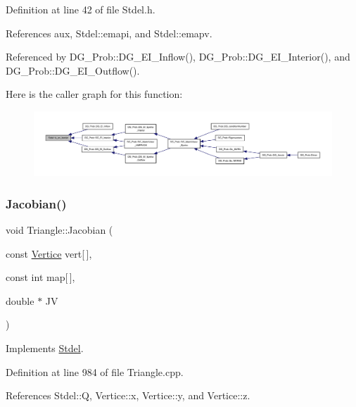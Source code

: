 Definition at line 42 of file Stdel.\+h.



References aux, Stdel\+::emapi, and Stdel\+::emapv.



Referenced by D\+G\+\_\+\+Prob\+::\+D\+G\+\_\+\+E\+I\+\_\+\+Inflow(), D\+G\+\_\+\+Prob\+::\+D\+G\+\_\+\+E\+I\+\_\+\+Interior(), and D\+G\+\_\+\+Prob\+::\+D\+G\+\_\+\+E\+I\+\_\+\+Outflow().

Here is the caller graph for this function\+:
\nopagebreak
\begin{figure}[H]
\begin{center}
\leavevmode
\includegraphics[width=350pt]{classStdel_abb022f0ad81707e11e3a3091d2d87c46_icgraph}
\end{center}
\end{figure}
\mbox{\label{classTriangle_a723405bf07d4123a417623114409b74e}} 
\subsubsection{\texorpdfstring{Jacobian()}{Jacobian()}}
{\footnotesize\ttfamily void Triangle\+::\+Jacobian (\begin{DoxyParamCaption}\item[{const \hyperlink{structVertice}{Vertice}}]{vert\mbox{[}$\,$\mbox{]},  }\item[{const int}]{map\mbox{[}$\,$\mbox{]},  }\item[{double $\ast$}]{JV }\end{DoxyParamCaption})\hspace{0.3cm}{\ttfamily [virtual]}}



Implements \hyperlink{classStdel_a953ff994c1bb423245aff079932c648f}{Stdel}.



Definition at line 984 of file Triangle.\+cpp.



References Stdel\+::Q, Vertice\+::x, Vertice\+::y, and Vertice\+::z.

